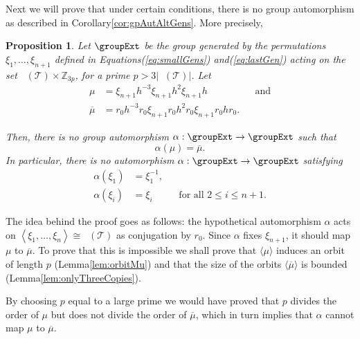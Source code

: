 \documentclass[final]{amsart}
\theoremstyle{plain}
\newtheorem{prop}[thm]{Proposition}
\theoremstyle{definition}
\theoremstyle{remark}
\numberwithin{equation}{section}
\renewcommand{\leq}{\leqslant} \renewcommand{\geq}{\geqslant}
\renewcommand{\{}{\lbrace}
\renewcommand{\}}{\rbrace}
\renewcommand{\bar}{\overline}
\newcommand{\bZ}{\mathbb{Z}}
\newcommand{\cT}{\mathcal{T}}
\DeclareMathOperator{\Fw}{\mathcal{F}^{w}}
\DeclareMathOperator{\mon}{Mon}
\DeclareMathOperator{\monw}{\mon^{w}}
\newcommand{\kng}{{h}}
\newcommand{\mub}{\bar{\mu}}
\newcommand{\te}{\xi}
\begin{document}
Next we will prove that under certain conditions, there is no group automorphism as described in Corollary\nobreakspace \ref {cor:gpAutAltGens}. 
More precisely,

\begin{prop}\label{prop:noGroupAut}
  Let $\groupExt$ be the group generated by the permutations $ \te_{1}, \dots, \te_{n+1} $ defined in Equations\nobreakspace \textup {(\ref {eq:smallGens})} and\nobreakspace  \textup {(\ref {eq:lastGen})} acting on  the set $\Fw(\cT) \times \bZ_{3p}$, for a prime $p > 3|\Fw(\cT)|$.
  Let
  \begin{equation}
    \label{eq:mu}
    \begin{aligned}
      \mu &= \te_{n+1}\kng^{-3}\te_{n+1} \kng^{2} \te_{n+1} \kng &&\text{and} \\
      \mub&= r_{0}\kng^{-3} r_{0}\te_{n+1} r_{0}\kng^{2} r_{0} \te_{n+1} r_{0}\kng r_{0}.
    \end{aligned}
  \end{equation}

  Then, there is no group automorphism $\alpha: \groupExt \to \groupExt$ such that \[\alpha(\mu) = \mub.\]
  In particular, there is no automorphism $\alpha:\groupExt \to \groupExt $ satisfying
  \[\begin{aligned}
	    \alpha(\te_{1}) &= \te^{-1}_{1},&& \\
    \alpha(\te_{i}) &= \te_{i} &&\text{for all } 2 \leq i \leq n+1.
\end{aligned}\]
\end{prop}




The idea behind the proof goes as follows: the hypothetical automorphism $\alpha$ acts on $\left\langle    \te_{1}, \dots, \te_{n} \right\rangle \cong \monw(\cT) $ as conjugation by $r_{0}$.
Since $\alpha$ fixes $\te_{n+1}$, it should map $\mu$ to $\mub$.
To prove that this is impossible we shall prove that $\langle \mu \rangle$ induces an orbit of length $p$ (Lemma\nobreakspace \ref {lem:orbitMu}) and that the size of the orbits $\langle \mub \rangle$ is bounded (Lemma\nobreakspace \ref {lem:onlyThreeCopies}).

By choosing $p$ equal to a large prime we would have proved that $p$ divides the order of $\mu$ but does not divide the order of $\mub$, which in turn implies that $\alpha$ cannot map $\mu$ to $\mub$.
\end{document}
